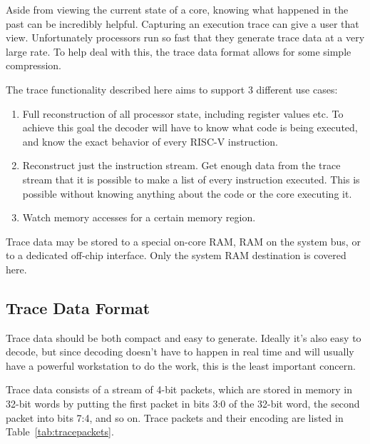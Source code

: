 \documentclass{article}
\begin{document}
Aside from viewing the current state of a core, knowing what happened in the
past can be incredibly helpful. Capturing an execution trace can give a user
that view.  Unfortunately processors run so fast that they generate trace data
at a very large rate. To help deal with this, the trace data format allows for
some simple compression.

The trace functionality described here aims to support 3 different use cases:
\begin{enumerate}
    \item Full reconstruction of all processor state, including register values
        etc. To achieve this goal the decoder will have to know what code is
        being executed, and know the exact behavior of every RISC-V
        instruction.
    \item Reconstruct just the instruction stream. Get enough data from the
        trace stream that it is possible to make a list of every instruction
        executed.  This is possible without knowing anything about the code or
        the core executing it.
    \item Watch memory accesses for a certain memory region.
\end{enumerate}

Trace data may be stored to a special on-core RAM, RAM on the system bus, or to
a dedicated off-chip interface. Only the system RAM destination is covered
here.

\subsection{Trace Data Format}

Trace data should be both compact and easy to generate. Ideally it's also easy
to decode, but since decoding doesn't have to happen in real time and will
usually have a powerful workstation to do the work, this is the least important
concern.

Trace data consists of a stream of 4-bit packets, which are stored in memory in
32-bit words by putting the first packet in bits 3:0 of the 32-bit word, the
second packet into bits 7:4, and so on. Trace packets and their encoding are
listed in Table~\ref{tab:tracepackets}.
\end{document}

